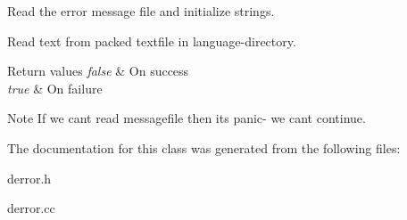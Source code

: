 Read the error message file and initialize strings.

Read text from packed textfile in language-\/directory.


\begin{DoxyRetVals}{Return values}
{\em false} & On success \\
\hline
{\em true} & On failure\\
\hline
\end{DoxyRetVals}
\begin{DoxyNote}{Note}
If we can\textquotesingle{}t read messagefile then it\textquotesingle{}s panic-\/ we can\textquotesingle{}t continue. 
\end{DoxyNote}


The documentation for this class was generated from the following files\+:\begin{DoxyCompactItemize}
\item 
derror.\+h\item 
derror.\+cc\end{DoxyCompactItemize}
